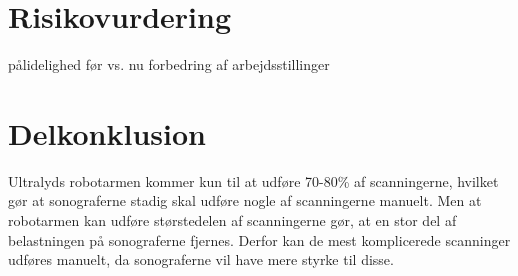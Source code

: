 \section{Risikovurdering}
pålidelighed
før vs. nu
forbedring af arbejdsstillinger
\section{Delkonklusion}
Ultralyds robotarmen kommer kun til at udføre 70-80\% af scanningerne, hvilket gør at sonograferne stadig skal udføre nogle af scanningerne manuelt. Men at robotarmen kan udføre størstedelen af scanningerne gør, at en stor del af belastningen på sonograferne fjernes. Derfor kan de mest komplicerede scanninger udføres manuelt, da sonograferne vil have mere styrke til disse.

